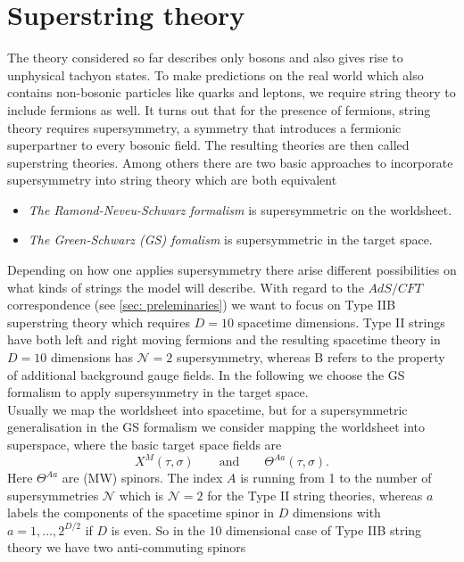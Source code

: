 \section{Superstring theory}
The theory considered so far describes only bosons and also gives rise to unphysical tachyon states. To make predictions on the real world which also contains non-bosonic particles like quarks and leptons, we require string theory to include fermions as well. It turns out that for the presence of fermions, string theory requires supersymmetry, a symmetry that introduces a fermionic superpartner to every bosonic field. The resulting theories are then called superstring theories. Among others there are two basic approaches to incorporate supersymmetry into string theory \cite{Becker:2007zj} which are both equivalent
%
%
\begin{itemize}
\item \textit{The Ramond-Neveu-Schwarz formalism} is supersymmetric on the worldsheet.
%
\item \textit{The Green-Schwarz (GS) fomalism} is supersymmetric in the target space.
\end{itemize}
%
%
Depending on how one applies supersymmetry there arise different possibilities on what kinds of strings the model will describe. With regard to the $AdS/CFT$ correspondence (see \autoref{sec: preleminaries}) we want to focus on Type IIB superstring theory which requires $D=10$ spacetime dimensions. Type II strings have both left and right moving fermions and the resulting spacetime theory in $D=10$ dimensions has $\mathcal{N}=2$ supersymmetry, whereas B refers to the property of additional background gauge fields. In the following we choose the GS formalism to apply supersymmetry in the target space. \\
Usually we map the worldsheet into spacetime, but for a supersymmetric generalisation in the GS formalism we consider mapping the worldsheet into superspace, where the basic target space fields are
%
%
\begin{equation}
X^{M}(\tau,\sigma) \qquad \text{and} \qquad \mathit{\Theta}^{Aa}(\tau,\sigma).
\end{equation}
%
%
Here $\mathit{\Theta}^{Aa}$ are  (MW) spinors. The index $A$ is running from 1 to the number of supersymmetries $\mathcal{N}$ which is $\mathcal{N}=2$ for the Type II string theories, whereas $a$ labels the components of the spacetime spinor in $D$ dimensions with $a=1,\ldots,2^{D/2}$ if $D$ is even. So in the 10 dimensional case of Type IIB string theory we have two anti-commuting spinors
